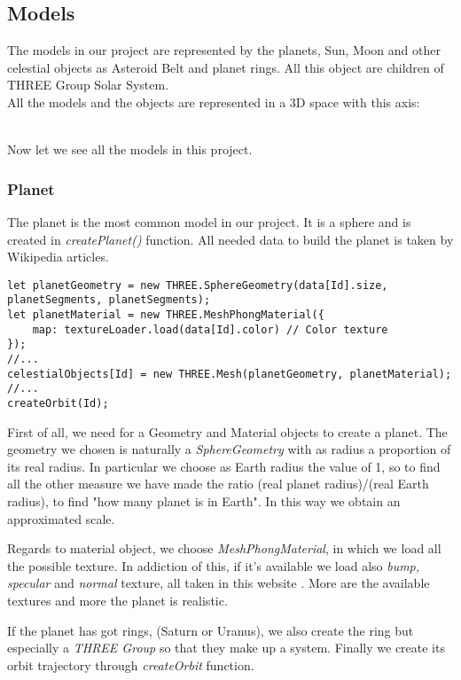 \documentclass{article}
\begin{document}
\subsection{Models}
The models in our project are represented by the planets, Sun, Moon and other celestial objects as Asteroid Belt and planet rings. All this object are children of THREE Group Solar System.\\
All the models and the objects are represented in a 3D space with this axis:
\\
\\
Now let we see all the models in this project.

\subsubsection{Planet} 
The planet is the most common model in our project. It is a sphere and is created in \textit{createPlanet()} function. All needed data to build the planet is taken by Wikipedia articles\cite{wikipedia}.
\begin{lstlisting}
let planetGeometry = new THREE.SphereGeometry(data[Id].size, planetSegments, planetSegments);
let planetMaterial = new THREE.MeshPhongMaterial({
	map: textureLoader.load(data[Id].color) // Color texture
});
//...
celestialObjects[Id] = new THREE.Mesh(planetGeometry, planetMaterial);
//...
createOrbit(Id);
\end{lstlisting}
First of all, we need for a Geometry and Material objects to create a planet. The geometry we chosen is naturally a \textit{SphereGeometry} with as radius a proportion of its real radius. In particular we choose as Earth radius the value of 1, so to find all the other measure we have made the ratio (real planet radius)/(real Earth radius), to find "how many planet is in Earth". In this way we obtain an approximated scale.
\par Regards to material object, we choose \textit{MeshPhongMaterial}, in which we load all the possible texture. In addiction of this, if it's available we load also \textit{bump, specular} and \textit{normal} texture, all taken in this website \cite{planetpixelemporium}. More are the available textures and more the planet is realistic.
\par If the planet has got rings, (Saturn or Uranus), we also create the ring but especially a \textit{THREE Group} so that they make up a system.
Finally we create its orbit trajectory through \textit{createOrbit} function.
\end{document}
